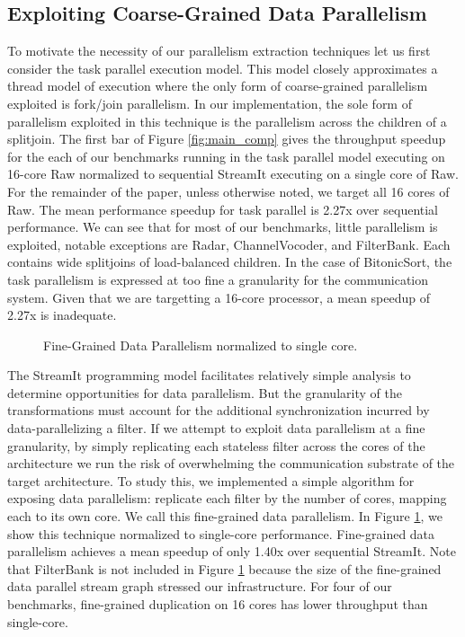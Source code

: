 \subsection{Exploiting Coarse-Grained Data Parallelism}
To motivate the necessity of our parallelism extraction techniques let
us first consider the task parallel execution model.  This model
closely approximates a thread model of execution where the only form
of coarse-grained parallelism exploited is fork/join parallelism.  In
our implementation, the sole form of parallelism exploited in this
technique is the parallelism across the children of a splitjoin. The
first bar of Figure \ref{fig:main_comp} gives the throughput speedup
for the each of our benchmarks running in the task parallel model
executing on 16-core Raw normalized to sequential StreamIt executing
on a single core of Raw.  For the remainder of the paper,
unless otherwise noted, we target all 16 cores of Raw.  The 
mean performance speedup for task parallel is 2.27x over sequential
performance. We can see that for most of our benchmarks, little
parallelism is exploited, notable exceptions are Radar,
ChannelVocoder, and FilterBank.  Each contains wide splitjoins of
load-balanced children.  In the case of BitonicSort, the task
parallelism is expressed at too fine a granularity for the
communication system.  Given that we are targetting a 16-core
processor, a mean speedup of 2.27x is inadequate.

\begin{figure}[t]
\centering
{}
\caption{Fine-Grained Data Parallelism normalized to single core.
\protect\label{fig:fine_data}}
\vspace{-6pt}
\end{figure}
The StreamIt programming model facilitates relatively simple analysis
to determine opportunities for data parallelism.  But the granularity
of the transformations must account for the additional synchronization
incurred by data-parallelizing a filter.  If we attempt to exploit
data parallelism at a fine granularity, by simply replicating each
stateless filter across the cores of the architecture we run the risk
of overwhelming the communication substrate of the target
architecture.  To study this, we implemented a simple algorithm for
exposing data parallelism: replicate each filter by the number of
cores, mapping each to its own core.  We call this fine-grained data
parallelism.  In Figure \ref{fig:fine_data}, we show this technique
normalized to single-core performance.  Fine-grained data parallelism
achieves a mean speedup of only 1.40x over sequential StreamIt.  Note
that FilterBank is not included in Figure \ref{fig:fine_data} because
the size of the fine-grained data parallel stream graph stressed our
infrastructure.  For four of our benchmarks, fine-grained duplication
on 16 cores has lower throughput than single-core.

